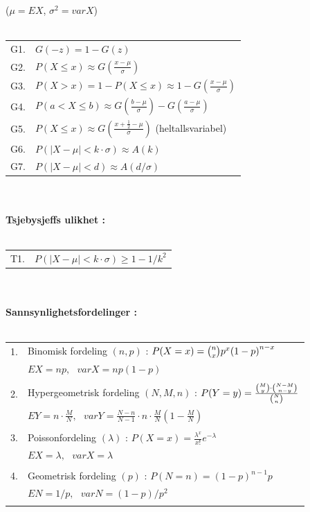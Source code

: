  ($\mu=EX$, ${\sigma}^2=varX$)\\ \\
\begin{tabular}{ll}
G1.& $G(-z)=1-G(z)$ \\[0.1cm]
G2.& $P(X\leq x)\approx G(\frac{x-\mu}{\sigma })$\\[0.1cm]
G3.& $P(X>x)=1-P(X\leq x)\approx 1-G(\frac{x-\mu}{\sigma })$\\[0.1cm]
G4.& $P(a<X\leq b)\approx G(\frac{b-\mu}{\sigma })-G(\frac{a-\mu}{\sigma })$\\[0.1cm]
G5.& $P(X\leq x)\approx G(\frac{x+\frac{1}{2}-\mu}{\sigma })$ (heltallsvariabel)\\[0.1cm]
G6.& $ P(\mid X-\mu \mid < k\cdot \sigma)\approx A(k)$\\[0.1cm]
G7.& $ P(\mid X-\mu \mid < d)\approx A(d/\sigma)$
\end{tabular} \\ \\
{\bf Tsjebysjeffs ulikhet :}\\ \\
\begin{tabular}{ll}
T1.& $ P(\mid X-\mu \mid < k\cdot \sigma) \geq 1-1/k^2$
\end{tabular}\\ \\
{\bf Sannsynlighetsfordelinger :} \\ \\
\begin{tabular}{ll}
1.& Binomisk fordeling $(n,p)$ :  $  P(X=x)={{n}\choose{x}}p^x{(1-p)}^{n-x} $\\[0.1cm]
  & $ EX=np, \mbox{\ \ \ } varX=np(1-p) $\\ \\
2.& Hypergeometrisk fordeling $(N,M,n)$ :
     $ P(Y=y)= \frac{{{M}\choose{y}} \cdot {{N-M}\choose{n-y}}}{{{N}\choose{n}}} $ \\[0.1cm] 
  & $ EY=n\cdot \frac{M}{N}, \mbox{\ \ \ } varY=\frac{N-n}{N-1}\cdot n\cdot
                                            \frac{M}{N}(1-\frac{M}{N}) $\\ \\ 
3.& Poissonfordeling $(\lambda)$ :  $ P(X=x)=\frac{{\lambda}^x}{x!}e^{-\lambda} $\\[0.1cm]
  & $ EX=\lambda,\mbox{\ \ \ } varX=\lambda$\\ \\
4.& Geometrisk fordeling $(p)$ :  $ P(N=n)={(1-p)}^{n-1} p $\\[0.1cm]
  & $ EN=1/p, \mbox{\ \ \ } varN=(1-p)/p^2 $\\ \\
\end{tabular} \\ \\
